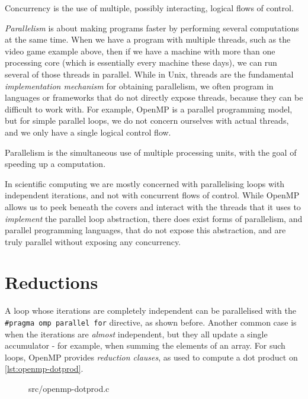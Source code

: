 \begin{definition}[Concurrency]
  Concurrency is the use of multiple, possibly interacting, logical
  flows of control.
\end{definition}

\emph{Parallelism} is about making programs faster by performing
several computations at the same time.  When we have a program with
multiple threads, such as the video game example above, then if we
have a machine with more than one processing core (which is
essentially every machine these days), we can run several of those
threads in parallel.  While in Unix, threads are the fundamental
\emph{implementation mechanism} for obtaining parallelism, we often
program in languages or frameworks that do not directly expose
threads, because they can be difficult to work with.  For example,
OpenMP is a parallel programming model, but for simple parallel loops,
we do not concern ourselves with actual threads, and we only have a
single logical control flow.

\begin{definition}[Parallelism]
  Parallelism is the simultaneous use of multiple processing units,
  with the goal of speeding up a computation.
\end{definition}

In scientific computing we are mostly concerned with parallelising
loops with independent iterations, and not with concurrent flows of
control.  While OpenMP allows us to peek beneath the covers and
interact with the threads that it uses to \textit{implement} the
parallel loop abstraction, there does exist forms of parallelism, and
parallel programming languages, that do not expose this abstraction,
and are truly parallel without exposing any concurrency.

\section{Reductions}
\label{sec:reductions}

A loop whose iterations are completely independent can be parallelised
with the \lstinline{#pragma omp parallel for} directive, as shown
before.  Another common case is when the iterations are
\emph{almost} independent, but they all update a single accumulator
- for example, when summing the elements of an array.  For such loops,
OpenMP provides \emph{reduction clauses}, as used to compute a dot
product on \cref{lst:openmp-dotprod}.

\begin{figure}

{src/openmp-dotprod.c}
\end{figure}

